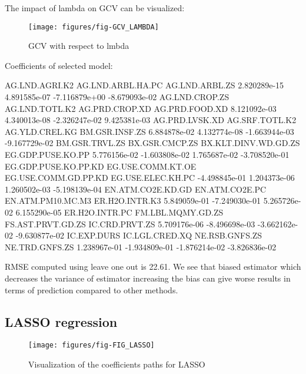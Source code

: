 \documentclass[a4paper]{article}
\begin{document}
The impact of lambda on GCV can be visualized:
\begin{figure}[H]
\begin{center}
\texttt{[image: figures/fig-GCV\_LAMBDA]}
\caption{GCV with respect to lmbda}
\end{center}
\end{figure}
Coefficients of selected model:
\begin{Schunk}
\begin{Soutput}
                           AG.LND.AGRI.K2    AG.LND.ARBL.HA.PC       AG.LND.ARBL.ZS 
        2.820289e-15         4.891585e-07        -7.116879e+00        -8.679093e-02 
      AG.LND.CROP.ZS       AG.LND.TOTL.K2       AG.PRD.CROP.XD       AG.PRD.FOOD.XD 
        8.121092e-03         4.340013e-08        -2.326247e-02         9.425381e-03 
      AG.PRD.LVSK.XD       AG.SRF.TOTL.K2       AG.YLD.CREL.KG       BM.GSR.INSF.ZS 
        6.884878e-02         4.132774e-08        -1.663944e-03        -9.167729e-02 
      BM.GSR.TRVL.ZS       BX.GSR.CMCP.ZS BX.KLT.DINV.WD.GD.ZS    EG.GDP.PUSE.KO.PP 
        5.776156e-02        -1.603808e-02         1.765687e-02        -3.708520e-01 
EG.GDP.PUSE.KO.PP.KD    EG.USE.COMM.KT.OE EG.USE.COMM.GD.PP.KD    EG.USE.ELEC.KH.PC 
       -4.498845e-01         1.204373e-06         1.260502e-03        -5.198139e-04 
   EN.ATM.CO2E.KD.GD       EN.ATM.CO2E.PC    EN.ATM.PM10.MC.M3       ER.H2O.INTR.K3 
        5.849059e-01        -7.249030e-01         5.265726e-02         6.155290e-05 
      ER.H2O.INTR.PC    FM.LBL.MQMY.GD.ZS    FS.AST.PRVT.GD.ZS       IC.CRD.PRVT.ZS 
        5.709176e-06        -8.496698e-03        -3.662162e-02        -9.630877e-02 
         IC.EXP.DURS       IC.LGL.CRED.XQ       NE.RSB.GNFS.ZS       NE.TRD.GNFS.ZS 
        1.238967e-01        -1.934809e-01        -1.876214e-02        -3.826836e-02 
\end{Soutput}
\end{Schunk}
RMSE computed using leave one out is
22.61. We see that biased estimator which
decreases the variance of estimator increasing the bias can give worse results
in terms of prediction compared to other methods.

\subsection{LASSO regression}
\begin{figure}[H]
\begin{center}
\texttt{[image: figures/fig-FIG\_LASSO]}
\caption{Visualization of the coefficients paths for LASSO}
\end{center}
\end{figure}
\end{document}
